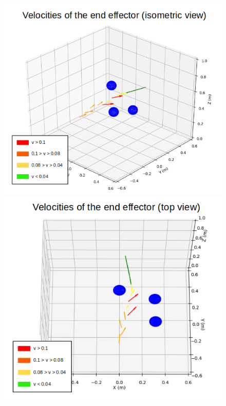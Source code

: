 \documentclass[a4paper, 11.5pt, conference]{ieeeconf}      %
\begin{document}
\begin{figure}[H]
	\centering
	\includegraphics[scale=0.30]{images/one_arm_three_obstacles_vector.png}
	\includegraphics[scale=0.30]{images/one_arm_three_obstacles_top_vector.png}

\end{figure}
\end{document}
